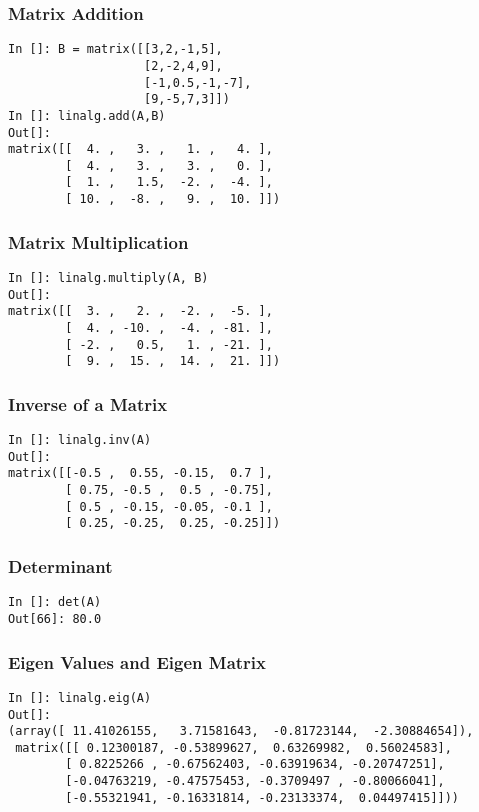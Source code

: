 \documentclass[14pt,compress]{beamer}
\begin{document}
\begin{frame}[fragile]
  \frametitle{Matrix Addition}
  \begin{lstlisting}
In []: B = matrix([[3,2,-1,5],
                   [2,-2,4,9],
                   [-1,0.5,-1,-7],
                   [9,-5,7,3]])
In []: linalg.add(A,B)
Out[]: 
matrix([[  4. ,   3. ,   1. ,   4. ],
        [  4. ,   3. ,   3. ,   0. ],
        [  1. ,   1.5,  -2. ,  -4. ],
        [ 10. ,  -8. ,   9. ,  10. ]])
  \end{lstlisting}
\end{frame}

\begin{frame}[fragile]
\frametitle{Matrix Multiplication}
\begin{lstlisting}
In []: linalg.multiply(A, B)
Out[]: 
matrix([[  3. ,   2. ,  -2. ,  -5. ],
        [  4. , -10. ,  -4. , -81. ],
        [ -2. ,   0.5,   1. , -21. ],
        [  9. ,  15. ,  14. ,  21. ]])
\end{lstlisting}
\end{frame}

\begin{frame}[fragile]
\frametitle{Inverse of a Matrix}
\begin{small}
\begin{lstlisting}
In []: linalg.inv(A)
Out[]: 
matrix([[-0.5 ,  0.55, -0.15,  0.7 ],
        [ 0.75, -0.5 ,  0.5 , -0.75],
        [ 0.5 , -0.15, -0.05, -0.1 ],
        [ 0.25, -0.25,  0.25, -0.25]])
\end{lstlisting}
\end{small}
\end{frame}

\begin{frame}[fragile]
\frametitle{Determinant}
\begin{lstlisting}
In []: det(A)
Out[66]: 80.0
\end{lstlisting}
\end{frame}

\begin{frame}[fragile]
\frametitle{Eigen Values and Eigen Matrix}
\begin{small}
\begin{lstlisting}
In []: linalg.eig(A)
Out[]: 
(array([ 11.41026155,   3.71581643,  -0.81723144,  -2.30884654]),
 matrix([[ 0.12300187, -0.53899627,  0.63269982,  0.56024583],
        [ 0.8225266 , -0.67562403, -0.63919634, -0.20747251],
        [-0.04763219, -0.47575453, -0.3709497 , -0.80066041],
        [-0.55321941, -0.16331814, -0.23133374,  0.04497415]]))
\end{lstlisting}
\end{small}
\end{frame}
\end{document}
